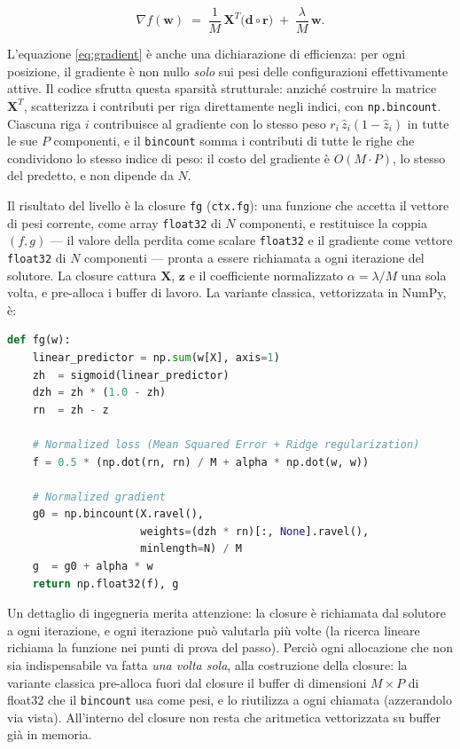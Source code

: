 \begin{equation}
  \nabla f(\bm{w}) \;=\;
  \frac{1}{M}\,\bm{X}^{T}\bigl(\bm{d} \circ \bm{r}\bigr)
  \;+\; \frac{\lambda}{M}\,\bm{w} .
  \label{eq:gradient-compact}
\end{equation}

L'equazione \eqref{eq:gradient} è anche una dichiarazione di efficienza: per
ogni posizione, il gradiente è non nullo \emph{solo} sui pesi delle
configurazioni effettivamente attive. Il codice sfrutta questa sparsità
strutturale: anziché costruire la matrice $\bm{X}^{T}$, scatterizza i
contributi per riga direttamente negli indici, con \texttt{np.bincount}.
Ciascuna riga $i$ contribuisce al gradiente con lo stesso peso
$r_i\,\hat z_i(1-\hat z_i)$ in tutte le sue $P$ componenti, e il
\texttt{bincount} somma i contributi di tutte le righe che condividono lo
stesso indice di peso: il costo del gradiente è $O(M \cdot P)$, lo stesso del
predetto, e non dipende da $N$.

Il risultato del livello è la closure \texttt{fg} (\texttt{ctx.fg}): una
funzione che accetta il vettore di pesi corrente, come array \texttt{float32}
di $N$ componenti, e restituisce la coppia $(f, g)$ — il valore della perdita
come scalare \texttt{float32} e il gradiente come vettore \texttt{float32} di
$N$ componenti — pronta a essere richiamata a ogni iterazione del solutore. La closure cattura $\bm{X}$, $\bm{z}$ e il
coefficiente normalizzato $\alpha = \lambda/M$ una sola volta, e pre-alloca i
buffer di lavoro. La variante classica, vettorizzata in NumPy, è:

\begin{lstlisting}[language=python, caption={La closure \texttt{fg} della variante
classica (estratto di \texttt{hlp\_gradient\_compute}).}]
def fg(w):
    linear_predictor = np.sum(w[X], axis=1)
    zh  = sigmoid(linear_predictor)
    dzh = zh * (1.0 - zh)
    rn  = zh - z

    # Normalized loss (Mean Squared Error + Ridge regularization)
    f = 0.5 * (np.dot(rn, rn) / M + alpha * np.dot(w, w))

    # Normalized gradient
    g0 = np.bincount(X.ravel(),
                     weights=(dzh * rn)[:, None].ravel(),
                     minlength=N) / M
    g  = g0 + alpha * w
    return np.float32(f), g
\end{lstlisting}

Un dettaglio di ingegneria merita attenzione: la closure è richiamata dal
solutore a ogni iterazione, e ogni iterazione può valutarla più volte (la
ricerca lineare richiama la funzione nei punti di prova del passo). Perciò
ogni allocazione che non sia indispensabile va fatta \emph{una volta sola},
alla costruzione della closure: la variante classica pre-alloca fuori dal
closure il buffer di dimensioni $M \times P$ di float32 che il
\texttt{bincount} usa come pesi, e lo riutilizza a ogni chiamata
(azzerandolo via vista). All'interno del closure non resta che aritmetica
vettorizzata su buffer già in memoria.

